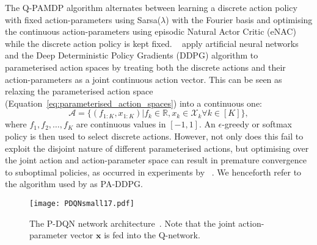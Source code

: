 \documentclass{article}
\newcommand{\Real}{\mathbb{R}}
\def\PDQN*{P\nobreakdash-DQN}
\def\QPAMDP*{Q\nobreakdash-PAMDP}
\def\PADDPG*{PA\nobreakdash-DDPG}
\newcommand{\citet}[1]
{\citeauthor{#1}~\shortcite{#1}}
\newcommand{\citep}{\cite}
\begin{document}
The \QPAMDP* algorithm \citep{masson2016} alternates between learning a discrete action policy with fixed action-parameters using Sarsa($\lambda$) \citep{sutton1998} with the Fourier basis \citep{konidaris2011} and optimising the continuous action-parameters using episodic Natural Actor Critic (eNAC) \citep{peters2005} while the discrete action policy is kept fixed.
\citet{hausknecht2016} apply artificial neural networks and the Deep Deterministic Policy Gradients (DDPG) algorithm \citep{lillicrap2015} to parameterised action spaces by treating both the discrete actions and their action-parameters as a joint continuous action vector. This can be seen as relaxing the parameterised action space (Equation~\ref{eq:parameterised_action_spaces}) 
into a continuous one:
\begin{equation}
\mathcal{A} = \{(f_{1:K}, x_{1:K}) | f_k \in \Real, x_k \in \mathcal{X}_k \forall k \in [K]	\},
\end{equation}
where $f_1, f_2, \dots, f_K$ are continuous values in $[-1,1]$. An $\epsilon$-greedy or softmax policy is then used to select discrete actions. However, not only does this fail to exploit the disjoint nature of different parameterised actions, but optimising over the joint action and action-parameter space can result in premature convergence to suboptimal policies, as occurred in experiments by \citet{masson2016}. We henceforth refer to the algorithm used by \citeauthor{hausknecht2016} as \PADDPG*. 


\begin{figure}
	\centering
\texttt{[image: PDQNsmall17.pdf]}
	\caption[The \PDQN* network architecture]{The \PDQN* network architecture~\protect\citep{xiong2018}. Note that the joint action-parameter vector $\mathbf{x}$ is fed into the Q-network.}
	\label{fig:pdqn}
\end{figure}
\end{document}
